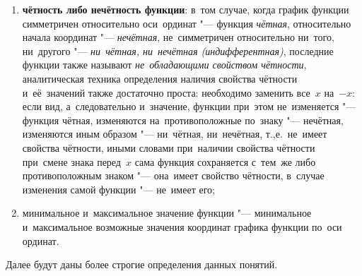 \documentclass[]{scrartcl}
\begin{document}
{{\begin{enumerate}
	\item \textbf{чётность либо нечётность функции}: в~том случае, когда график функции симметричен относительно оси~ординат "--- функция \emph{чётная}, относительно начала координат "--- \emph{нечётная}, не~симметричен относительно ни~того, ни~другого "--- \emph{ни~чётная, ни~нечётная (индифферентная)}, последние функции также называют \emph{не~обладающими свойством чётности}, аналитическая техника определения наличия свойства чётности и~её~значений также достаточно проста: необходимо заменить все~${\textstyle x}$ на~${\textstyle -x}$: если вид, а~следовательно и~значение, функции при~этом не~изменяется "--- функция чётная, изменяются на~противоположные по~знаку "--- нечётная, изменяются иным образом "--- ни~чётная, ни~нечётная, т.,е.~не~имеет свойства чётности, иными словами при~наличии свойства чётности при~смене знака перед~${\textstyle x}$ сама функция сохраняется с~тем~же либо противоположным знаком "--- она~имеет свойство чётности, в~случае изменения самой функции "--- не~имеет его;
	\item минимальное и~максимальное значение функции "--- минимальное и~максимальное возможные значения координат графика функции по~оси ординат.  
\end{enumerate}
Далее будут даны более строгие определения данных понятий.

}}
\end{document}
